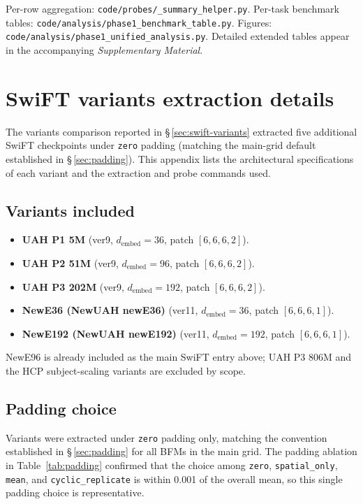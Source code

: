 \documentclass[11pt, a4paper]{article}
\newcommand{\fefn}[1]{\texttt{\small #1}}
\begin{document}
Per-row aggregation: \fefn{code/probes/\_summary\_helper.py}. Per-task benchmark tables:
\fefn{code/analysis/phase1\_benchmark\_table.py}. Figures:
\fefn{code/analysis/phase1\_unified\_analysis.py}. Detailed extended tables appear in the
accompanying \emph{Supplementary Material}.

\section{SwiFT variants extraction details}
\label{app:variants}

The variants comparison reported in \S\,\ref{sec:swift-variants} extracted five additional
SwiFT checkpoints under \texttt{zero} padding (matching the main-grid default established
in \S\,\ref{sec:padding}). This appendix lists the architectural specifications of each
variant and the extraction and probe commands used.

\subsection{Variants included}
\begin{itemize}[leftmargin=1.4em, itemsep=1pt]
  \item \textbf{UAH P1 5M} (ver9, $d_{\text{embed}}=36$, patch $[6,6,6,2]$).
  \item \textbf{UAH P2 51M} (ver9, $d_{\text{embed}}=96$, patch $[6,6,6,2]$).
  \item \textbf{UAH P3 202M} (ver9, $d_{\text{embed}}=192$, patch $[6,6,6,2]$).
  \item \textbf{NewE36 (NewUAH newE36)} (ver11, $d_{\text{embed}}=36$, patch $[6,6,6,1]$).
  \item \textbf{NewE192 (NewUAH newE192)} (ver11, $d_{\text{embed}}=192$, patch
        $[6,6,6,1]$).
\end{itemize}
NewE96 is already included as the main SwiFT entry above; UAH P3 806M and the HCP
subject-scaling variants are excluded by scope.

\subsection{Padding choice}
Variants were extracted under \texttt{zero} padding only, matching the convention
established in \S\,\ref{sec:padding} for all BFMs in the main grid. The padding ablation
in Table~\ref{tab:padding} confirmed that the choice among \texttt{zero},
\texttt{spatial\_only}, \texttt{mean}, and \texttt{cyclic\_replicate} is within
\num{0.001} of the overall mean, so this single padding choice is representative.
\end{document}
